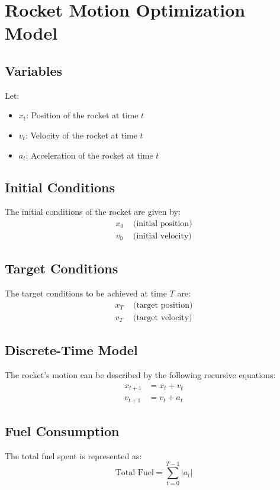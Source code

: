 \documentclass{article}
\begin{document}
\section*{Rocket Motion Optimization Model}

\subsection*{Variables}
Let:
\begin{itemize}
    \item $x_t$: Position of the rocket at time $t$
    \item $v_t$: Velocity of the rocket at time $t$
    \item $a_t$: Acceleration of the rocket at time $t$
\end{itemize}

\subsection*{Initial Conditions}
The initial conditions of the rocket are given by:
\begin{align*}
    x_0 & \text{ (initial position)} \\
    v_0 & \text{ (initial velocity)} 
\end{align*}

\subsection*{Target Conditions}
The target conditions to be achieved at time $T$ are:
\begin{align*}
    x_T & \text{ (target position)} \\
    v_T & \text{ (target velocity)} 
\end{align*}

\subsection*{Discrete-Time Model}
The rocket's motion can be described by the following recursive equations:
\begin{align*}
    x_{t+1} &= x_t + v_t \\
    v_{t+1} &= v_t + a_t
\end{align*}

\subsection*{Fuel Consumption}
The total fuel spent is represented as:
\[
\text{Total Fuel} = \sum_{t=0}^{T-1} |a_t|
\]
\end{document}
